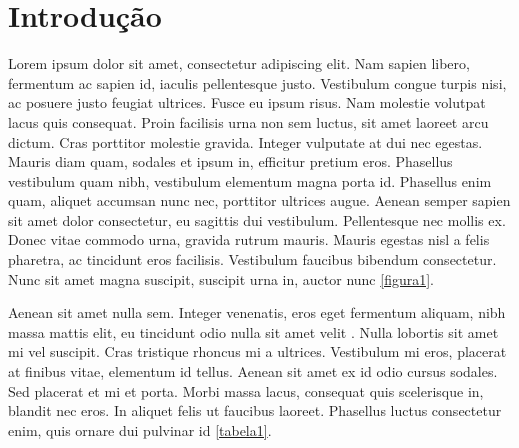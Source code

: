 \section{Introdução}
Lorem ipsum dolor sit amet, consectetur adipiscing elit. Nam sapien libero, fermentum ac sapien id, iaculis pellentesque justo. Vestibulum congue turpis nisi, ac posuere justo feugiat ultrices. Fusce eu ipsum risus. Nam molestie volutpat lacus quis consequat. Proin facilisis urna non sem luctus, sit amet laoreet arcu dictum. Cras porttitor molestie gravida. Integer vulputate at dui nec egestas. Mauris diam quam, sodales et ipsum in, efficitur pretium eros. Phasellus vestibulum quam nibh, vestibulum elementum magna porta id. Phasellus enim quam, aliquet accumsan nunc nec, porttitor ultrices augue. Aenean semper sapien sit amet dolor consectetur, eu sagittis dui vestibulum. Pellentesque nec mollis ex. Donec vitae commodo urna, gravida rutrum mauris. Mauris egestas nisl a felis pharetra, ac tincidunt eros facilisis. Vestibulum faucibus bibendum consectetur. Nunc sit amet magna suscipit, suscipit urna in, auctor nunc \ref{figura1}.

Aenean sit amet nulla sem. Integer venenatis, eros eget fermentum aliquam, nibh massa mattis elit, eu tincidunt odio nulla sit amet velit \cite{knuth:84}. Nulla lobortis sit amet mi vel suscipit. Cras tristique rhoncus mi a ultrices. Vestibulum mi eros, placerat at finibus vitae, elementum id tellus. Aenean sit amet ex id odio cursus sodales. Sed placerat et mi et porta. Morbi massa lacus, consequat quis scelerisque in, blandit nec eros. In aliquet felis ut faucibus laoreet. Phasellus luctus consectetur enim, quis ornare dui pulvinar id \ref{tabela1}.